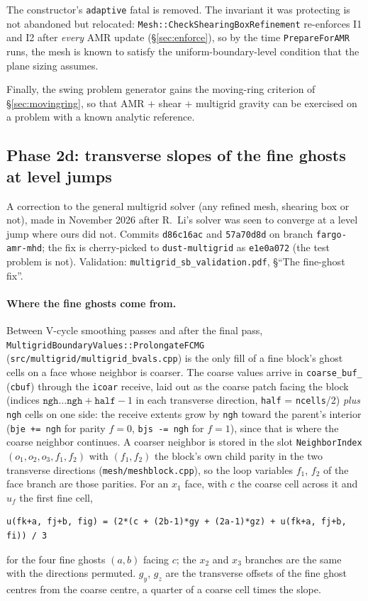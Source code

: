 \documentclass[11pt]{article}
\newcommand{\code}[1]{\texttt{#1}}
\newcommand{\file}[1]{\texttt{\small #1}}
\newcommand{\fn}[1]{\texttt{\small #1}}
\begin{document}
\noindent
The constructor's \code{adaptive} fatal is removed. The invariant it was protecting is
not abandoned but relocated: \fn{Mesh::CheckShearingBoxRefinement} re-enforces I1 and
I2 after \emph{every} AMR update (\S\ref{sec:enforce}), so by the time
\fn{PrepareForAMR} runs, the mesh is known to satisfy the uniform-boundary-level
condition that the plane sizing assumes.

Finally, the swing problem generator gains the moving-ring criterion of
\S\ref{sec:movingring}, so that AMR $+$ shear $+$ multigrid gravity can be exercised
on a problem with a known analytic reference.

\subsection{Phase 2d: transverse slopes of the fine ghosts at level jumps}
\label{sec:phase2d}

A correction to the general multigrid solver (any refined mesh, shearing box or not), made in
November 2026 after R.~Li's solver was seen to converge at a level jump where ours did not. Commits
\code{d86c16ac} and \code{57a70d8d} on branch \code{fargo-amr-mhd}; the fix is cherry-picked to
\code{dust-multigrid} as \code{e1e0a072} (the test problem is not).
Validation: \file{multigrid\_sb\_validation.pdf}, \S``The fine-ghost fix''.

\paragraph{Where the fine ghosts come from.} Between V-cycle smoothing passes and after the final
pass, \fn{MultigridBoundaryValues::ProlongateFCMG} (\file{src/multigrid/multigrid\_bvals.cpp}) is
the only fill of a fine block's ghost cells on a face whose neighbor is coarser. The coarse values
arrive in \code{coarse\_buf\_} (\code{cbuf}) through the \code{icoar} receive, laid out as the
coarse patch facing the block (indices $\code{ngh}\ldots\code{ngh}+\code{half}-1$ in each
transverse direction, \code{half} = \code{ncells}/2) \emph{plus} \code{ngh} cells on one side: the
receive extents grow by \code{ngh} toward the parent's interior (\code{bje += ngh} for parity
$f = 0$, \code{bjs -= ngh} for $f = 1$), since that is where the coarse neighbor continues. A
coarser neighbor is stored in the slot \fn{NeighborIndex}$(o_1,o_2,o_3,f_1,f_2)$ with $(f_1,f_2)$
the block's own child parity in the two transverse directions (\file{mesh/meshblock.cpp}), so the
loop variables $f_1$, $f_2$ of the face branch are those parities. For an $x_1$ face, with $c$ the
coarse cell across it and $u_f$ the first fine cell,
\begin{verbatim}
u(fk+a, fj+b, fig) = (2*(c + (2b-1)*gy + (2a-1)*gz) + u(fk+a, fj+b, fi)) / 3
\end{verbatim}
for the four fine ghosts $(a,b)$ facing $c$; the $x_2$ and $x_3$ branches are the same with the
directions permuted. $g_y$, $g_z$ are the transverse offsets of the fine ghost centres from the
coarse centre, a quarter of a coarse cell times the slope.
\end{document}

